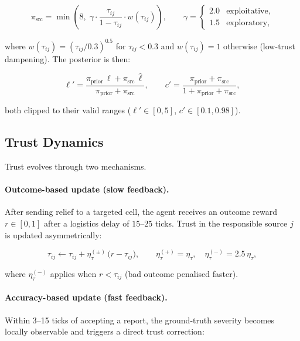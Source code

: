 \documentclass[pdflatex,sn-apa]{sn-jnl}%
\begin{document}
\begin{equation}
  \pi_\mathrm{src} =
  \min\!\left(8,\;
    \gamma \cdot \frac{\tau_{ij}}{1-\tau_{ij}}\cdot w(\tau_{ij})
  \right),
  \qquad
  \gamma =
  \begin{cases}
    2.0 & \text{exploitative,}\\
    1.5 & \text{exploratory,}
  \end{cases}
\end{equation}

where $w(\tau_{ij})=(\tau_{ij}/0.3)^{0.5}$ for $\tau_{ij}<0.3$ and
$w(\tau_{ij})=1$ otherwise (low-trust dampening).
The posterior is then:

\begin{equation}
  \ell' = \frac{\pi_\mathrm{prior}\,\ell + \pi_\mathrm{src}\,\hat\ell}
               {\pi_\mathrm{prior}+\pi_\mathrm{src}},
  \qquad
  c' = \frac{\pi_\mathrm{prior}+\pi_\mathrm{src}}
            {1+\pi_\mathrm{prior}+\pi_\mathrm{src}},
\end{equation}

both clipped to their valid ranges ($\ell'\in[0,5]$,
$c'\in[0.1,0.98]$).

\subsection{Trust Dynamics}

Trust evolves through two mechanisms.

\paragraph{Outcome-based update (slow feedback).}
After sending relief to a targeted cell, the agent receives an
outcome reward $r\in[0,1]$ after a logistics delay of
$15$--$25$ ticks.  Trust in the responsible source $j$ is updated
asymmetrically:

\begin{equation}
  \tau_{ij} \leftarrow \tau_{ij} +
  \eta_\tau^{(\pm)}\,\bigl(r - \tau_{ij}\bigr),
  \qquad
  \eta_\tau^{(+)} = \eta_\tau,\quad
  \eta_\tau^{(-)} = 2.5\,\eta_\tau,
\end{equation}

where $\eta_\tau^{(-)}$ applies when $r < \tau_{ij}$ (bad
outcome penalised faster).

\paragraph{Accuracy-based update (fast feedback).}
Within 3--15 ticks of accepting a report, the ground-truth severity
becomes locally observable and triggers a direct trust correction:
\end{document}
